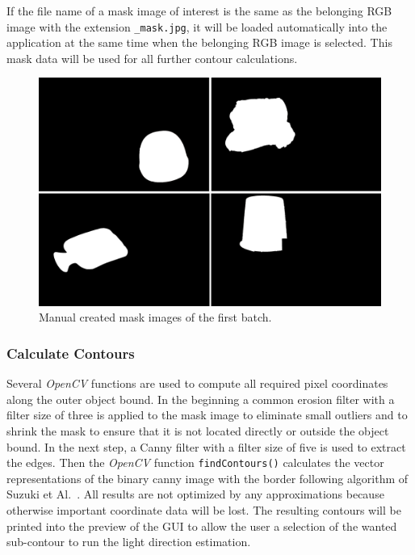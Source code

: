 If the file name of a mask image of interest is the same as the belonging RGB image with the extension \texttt{\_mask.jpg}, it will be loaded automatically into the application at the same time when the belonging RGB image is selected. This mask data will be used for all further contour calculations.

\begin{figure} [H]
	\center 
	\includegraphics[width=12cm]{Images/batch1_mask.jpg}			
	\caption[Bildunterschrift]{Manual created mask images of the first batch.}
	\label{fig:batch1mask}
\end{figure}
\subsubsection{Calculate Contours}\label{sec:findContours}

Several \textit{OpenCV} functions are used to compute all required pixel coordinates along the outer object bound. In the beginning a common erosion filter with a filter size of three is applied to the mask image to eliminate small outliers and to shrink the mask to ensure that it is not located directly or outside the object bound. In the next step, a Canny filter with a filter size of five is used to extract the edges. Then the \textit{OpenCV} function \texttt{findContours()} calculates the vector representations of the binary canny image with the border following algorithm of Suzuki et Al.~\cite{SUZUKI198532}. All results are not optimized by any approximations because otherwise important coordinate data will be lost. The resulting contours will be printed into the preview of the GUI to allow the user a selection of the wanted sub-contour to run the light direction estimation.

